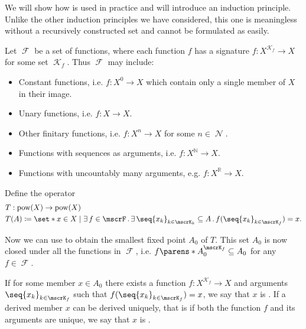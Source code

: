 \begin{remark}\label{rem:structural_recursion_and_induction}
  We will show how  is used in practice and will introduce an induction principle. Unlike the other induction principles we have considered, this one is meaningless without a recursively constructed set and cannot be formulated as easily.

  Let \( \mscrF \) be a set of functions, where each function \( f \) has a signature \( f: X^{\mscrK_f} \to X \) for some set \( \mscrK_f \). Thus \( \mscrF \) may include:
  \begin{itemize}
    \item Constant functions, i.e. \( f: X^0 \to X \) which contain only a single member of \( X \) in their image.
    \item Unary functions, i.e. \( f: X \to X \).
    \item Other finitary functions, i.e. \( f: X^n \to X \) for some \( n \in \mscrN \).
    \item Functions with sequences as arguments, i.e. \( f: X^\BbbN \to X \).
    \item Functions with uncountably many arguments, e.g. \( f: X^\BbbR \to X \).
  \end{itemize}

  Define the operator
  \begin{equation*}
    \begin{aligned}
      &T: \pow(X) \to \pow(X) \\
      &T(A) \coloneqq \set*{ x \in X \given \qexists{f \in \mscrF} \qexists{\seq{ x_k }_{k \in \mscrK_k} \subseteq A} f(\seq{ x_k }_{k \in \mscrK_f}) = x }.
    \end{aligned}
  \end{equation*}

  Now we can use  to obtain the smallest fixed point \( A_0 \) of \( T \). This set \( A_0 \) is now closed under all the functions in \( \mscrF \), i.e. \( f\parens*{ A_0^{\mscrK_f} } \subseteq A_0 \) for any \( f \in \mscrF \).

  If for some member \( x \in A_0 \) there exists a function \( f: X^{\mscrK_f} \to X \) and arguments \( \seq{ x_k }_{k \in \mscrK_f} \) such that \( f(\seq{ x_k }_{k \in \mscrK_f}) = x \), we say that \( x \) is . If a derived member \( x \) can be derived uniquely, that is if both the function \( f \) and its arguments are unique, we say that \( x \) is .


\end{remark}
